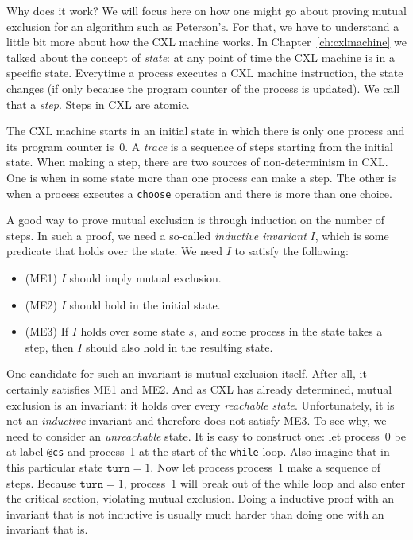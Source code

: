\documentclass{report}
\begin{document}
Why does it work?  We will focus here on how one might go about proving
mutual exclusion for an algorithm such as Peterson's.
For that, we have to understand a little bit more about how the CXL
machine works.
In Chapter~\ref{ch:cxlmachine} we talked about the concept of \emph{state}:
at any point of time the CXL machine is in a specific state.
Everytime a process executes a CXL machine instruction, the
state changes (if only because the program counter of the process is
updated).  We call that a \emph{step}.  Steps in CXL are atomic.

The CXL machine starts in an initial state in which there is only
one process and its program counter is~0.  A \emph{trace} is a
sequence of steps starting from the initial state.  When making a
step, there are two sources of non-determinism in CXL.  One is when
in some state more than one process can make a step.  The other is
when a process executes a \texttt{choose} operation and there is
more than one choice.

A good way to prove mutual exclusion is through induction on
the number of steps.
In such a proof, we need a so-called
\emph{inductive invariant} $I$, which is some predicate that holds
over the state.  We need $I$ to satisfy the following:
\begin{itemize}
\item (ME1) $I$ should imply mutual exclusion.
\item (ME2) $I$ should hold in the initial state.
\item (ME3) If $I$ holds over some state $s$, and some process in the
state takes a step, then $I$ should also hold in the resulting state.
\end{itemize}

One candidate for such an invariant is mutual exclusion itself.
After all, it certainly satisfies ME1 and ME2.
And as CXL has already determined, mutual exclusion is an invariant:
it holds over every \emph{reachable state}.
Unfortunately, it is not an \emph{inductive} invariant and therefore does
not satisfy ME3.
To see why, we need to consider an \emph{unreachable} state.
It is easy to construct one: let process~0 be at label \texttt{@cs}
and process~1 at the start of the \texttt{while} loop.
Also imagine that in this particular state $\mathtt{turn} = 1$.  Now let
process process~1 make a sequence of steps.  Because $\mathtt{turn} = 1$,
process~1 will break out of the while loop and also enter the critical
section, violating mutual exclusion.
Doing a inductive proof with an invariant that is not inductive is usually
much harder than doing one with an invariant that is.
\end{document}
